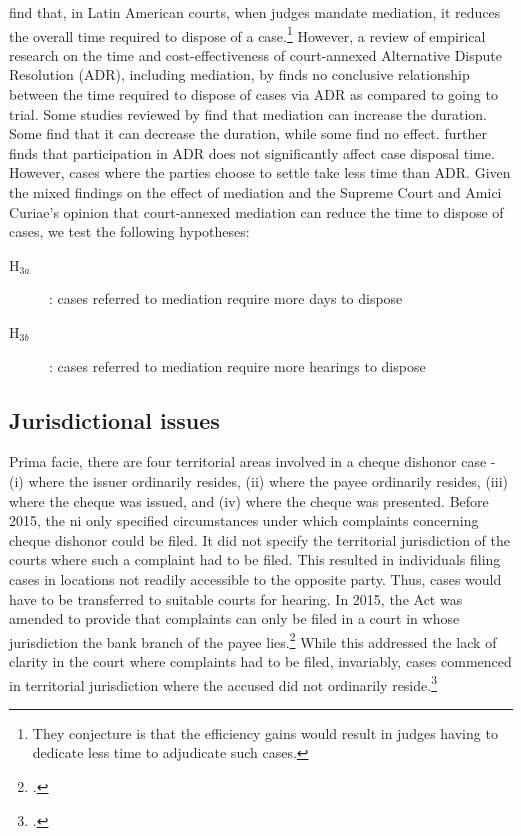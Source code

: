 \documentclass[12pt,a4paper]{article}
\begin{document}
		\textcite{buscaglia1997_latinAmericaCourtDelays} find that, in Latin American courts, when judges mandate mediation, it reduces the overall time required to dispose of a case.\footnote{They conjecture is that the efficiency gains would result in judges having to dedicate less time to adjudicate such cases.} However, a review of empirical research on the time and cost-effectiveness of court-annexed Alternative Dispute Resolution (ADR), including mediation, by \textcite{wissler2004effectiveness} finds no conclusive relationship between the time required to dispose of cases via ADR as compared to going to trial. Some studies reviewed by \textcite{wissler2004effectiveness} find that mediation can increase the duration. Some find that it can decrease the duration, while some find no effect. \textcite{heise2010adr} further finds that participation in ADR does not significantly affect case disposal time. However, cases where the parties choose to settle take less time than ADR. Given the mixed findings on the effect of mediation and the Supreme Court and Amici Curiae's opinion that court-annexed mediation can reduce the time to dispose of cases, we test the following hypotheses:
		
		\begin{description}
			\item[H$_{3a}$]: cases referred to mediation require more days to dispose
			\item[H$_{3b}$]: cases referred to mediation require more hearings to dispose
		\end{description}
		
		\subsection{Jurisdictional issues}
		
		Prima facie, there are four territorial areas involved in a cheque dishonor case - (i) where the issuer ordinarily resides, (ii) where the payee ordinarily resides, (iii) where the cheque was issued, and (iv) where the cheque was presented. Before 2015, the \gls{ni} only specified circumstances under which complaints concerning cheque dishonor could be filed. It did not specify the territorial jurisdiction of the courts where such a complaint had to be filed. This resulted in individuals filing cases in locations not readily accessible to the opposite party. Thus, cases would have to be transferred to suitable courts for hearing. In 2015, the Act was amended to provide that complaints can only be filed in a court in whose jurisdiction the bank branch of the payee lies.\footcite{niAmend2015} While this addressed the lack of clarity in the court where complaints had to be filed, invariably, cases commenced in territorial jurisdiction where the accused did not ordinarily reside.\footcite{amicus2020_submission}
		
\end{document}
